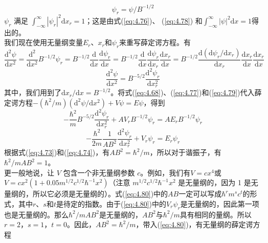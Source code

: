     \begin{equation}
        \psi_r = \psi / B^{-1/2}
        \label{eq:4.78}
    \end{equation}
    $\psi_r$ 满足 $\int_{-\infty}^{\infty} \left|\psi_r\right|^2\mathrm{d}x_r = 1$；这是由式(\ref{eq:4.76})、 (\ref{eq:4.78}) 和$\int_{-\infty}^{\infty} \left|\psi\right|^2\mathrm{d}x = 1$得出的。\\
    \indent 我们现在使用无量纲变量$E_r$、$x_r$和$\psi_r$来重写薛定谔方程。有
    \begin{equation*}
        \frac{\mathrm{d}^2\psi}{\mathrm{d}x^2} = \frac{\mathrm{d}^2}{\mathrm{d}x^2}B^{-1/2}\psi_r = B^{-1/2}\frac{\mathrm{d}}{\mathrm{d}x}\frac{\mathrm{d}\psi_r}{\mathrm{d}x} = B^{-1/2}\frac{\mathrm{d}}{\mathrm{d}x}\frac{\mathrm{d}\psi_r}{\mathrm{d}x_r}\frac{\mathrm{d}x_r}{\mathrm{d}x} = B^{-1/2}\frac{\mathrm{d}\left(\mathrm{d}\psi_r/\mathrm{d}x_r\right)}{\mathrm{d}x_r}\frac{\mathrm{d}x_r}{\mathrm{d}x}\frac{\mathrm{d}x_r}{\mathrm{d}x}
    \end{equation*}
    \begin{equation}
        \frac{\mathrm{d}^2\psi}{\mathrm{d}x^2} = B^{-5/2}\frac{\mathrm{d}^2\psi_r}{\mathrm{d}x_r^2}
        \label{eq:4.79}
    \end{equation}
    其中，我们用到了$\mathrm{d}x_r/\mathrm{d}x = B^{-1/2}$。将式(\ref{eq:4.68})、(\ref{eq:4.77})和(\ref{eq:4.79})代入薛定谔方程$-\left(\hbar^2/m\right)\left(\mathrm{d}^2\psi/\mathrm{d}x^2\right) + V\psi = E\psi$，得到
    \begin{equation*}
        -\frac{\hbar^2}{m}B^{-5/2}\frac{\mathrm{d}^2\psi_r}{\mathrm{d}x_r^2} + AV_rB^{-1/2}\psi_r = AE_rB^{-1/2}\psi_r
    \end{equation*}
    \begin{equation}
        -\frac{\hbar^2}{2m}\frac{1}{AB^2}\frac{\mathrm{d}^2\psi_r}{\mathrm{d}x_r^2} + V_r\psi_r = E_r\psi_r
        \label{eq:4.80}
    \end{equation}
    根据式(\ref{eq:4.73})和(\ref{eq:4.74})，有$AB^2 = \hbar^2/m$，所以对于谐振子，有$\hbar^2/mAB^2 = 1$。\\
    \indent 更一般地说，让 $V$ 包含一个非无量纲参数 $c$。例如，我们有$V = cx^4$或$V = cx^2\left(1+0.05m^{1/2}c^{1/2}\hbar^{-1}x^2\right)$（注意 $m^{1/2}c^{1/2}\hbar^{-1}x^2$ 是无量纲的，因为 1 是无量纲的，所以它必须是无量纲的）。式(\ref{eq:4.80})中的$AB$一定可以写成$\hbar^rm^sc^t$的形式，其中$r$、$s$和$t$是待定的指数。由于(\ref{eq:4.80})中的$V_r\psi_r$是无量纲的，因此第一项也是无量纲的。那么$\hbar^2/mAB^2$是无量纲的，$AB^2$与$\hbar^2/m$具有相同的量纲。所以$r=2$，$s=1$，$t=0$。因此，$AB^2 = \hbar^2/m$，带入(\ref{eq:4.80})，有无量纲的薛定谔方程
